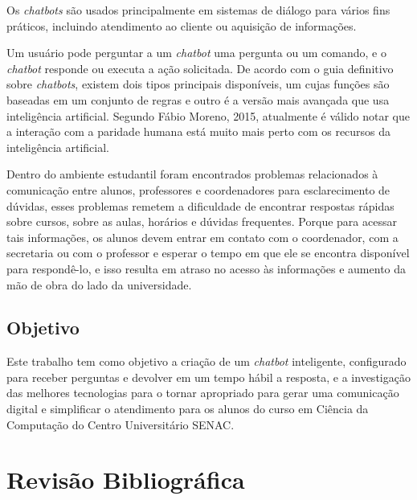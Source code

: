 \documentclass[
	12pt,				%
	oneside,
	a4paper,			%
	english,			%
	french,				%
	spanish,			%
	brazil				%
	]{abntex2}
\begin{document}
Os \emph{chatbots} são usados principalmente em sistemas de diálogo para vários fins práticos, incluindo atendimento ao cliente ou aquisição de informações.
  
Um usuário pode perguntar a um \emph{chatbot} uma pergunta ou um comando, e o \emph{chatbot} responde ou executa a ação solicitada.  
De acordo com o guia definitivo sobre \emph{chatbots}, existem dois tipos principais disponíveis, um cujas funções são baseadas em um conjunto de regras e outro é a versão mais avançada que usa inteligência artificial. 
Segundo Fábio Moreno, 2015, atualmente é válido notar que a interação com a paridade humana está muito mais perto com os recursos da inteligência artificial.

Dentro do ambiente estudantil foram encontrados problemas relacionados à comunicação entre alunos, professores e coordenadores para esclarecimento de dúvidas, esses problemas remetem a dificuldade de encontrar respostas rápidas sobre cursos, sobre as aulas, horários e dúvidas frequentes. Porque para acessar tais informações, os alunos devem entrar em contato com o coordenador, com a secretaria ou com o professor e esperar o tempo em que ele se encontra disponível para respondê-lo, e isso resulta em atraso no acesso às informações e aumento da mão de obra do lado da universidade.  


\section{Objetivo}

Este trabalho tem como objetivo a criação de um \emph{chatbot} inteligente, configurado para receber perguntas e devolver em um tempo hábil a resposta, e a investigação das melhores tecnologias para o tornar apropriado para gerar uma comunicação digital e simplificar o atendimento para os alunos do curso em Ciência da Computação do Centro Universitário SENAC.



%

\chapter{Revisão Bibliográfica}
\end{document}
